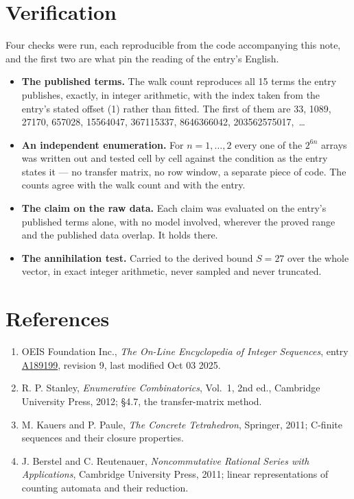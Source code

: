 \documentclass[11pt]{article}
\theoremstyle{definition}
\begin{document}
\section{Verification}

Four checks were run, each reproducible from the code accompanying this note, and the first two are what pin the reading of the entry's English.

\begin{itemize}

\item {\bfseries The published terms.} The walk count reproduces all 15 terms the entry publishes, exactly, in integer arithmetic, with the index taken from the entry's stated offset (1) rather than fitted. The first of them are 33, 1089, 27170, 657028, 15564047, 367115337, 8646366042, 203562575017,~\dots

\item {\bfseries An independent enumeration.} For $n = 1,\dots,2$ every one of the $2^{6n}$ arrays was written out and tested cell by cell against the condition as the entry states it --- no transfer matrix, no row window, a separate piece of code. The counts agree with the walk count and with the entry.

\item {\bfseries The claim on the raw data.} Each claim was evaluated on the entry's published terms alone, with no model involved, wherever the proved range and the published data overlap. It holds there.

\item {\bfseries The annihilation test.} Carried to the derived bound $S = 27$ over the whole vector, in exact integer arithmetic, never sampled and never truncated.

\end{itemize}

\section{References}

\begin{enumerate}

\item OEIS Foundation Inc., \emph{The On-Line Encyclopedia of Integer Sequences}, entry \href{https://oeis.org/A189199}{A189199}, revision 9, last modified Oct 03 2025.

\item R. P. Stanley, \emph{Enumerative Combinatorics}, Vol.~1, 2nd ed., Cambridge University Press, 2012; \S4.7, the transfer-matrix method.

\item M. Kauers and P. Paule, \emph{The Concrete Tetrahedron}, Springer, 2011; C-finite sequences and their closure properties.

\item J. Berstel and C. Reutenauer, \emph{Noncommutative Rational Series with Applications}, Cambridge University Press, 2011; linear representations of counting automata and their reduction.

\end{enumerate}
\end{document}
